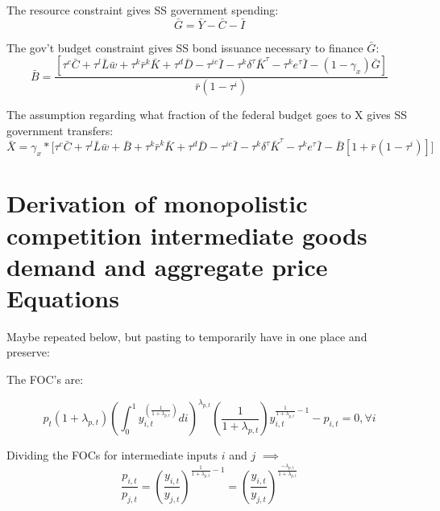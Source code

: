 The resource constraint gives SS government spending:
\begin{equation}
\bar{G} = \bar{Y}-\bar{C}-\bar{I}
\end{equation}

The gov't budget constraint gives SS bond issuance necessary to finance $\bar{G}$:
\begin{equation}
\bar{B} = \frac{\left[\tau^{c}\bar{C} + \tau^{l}\bar{L}\bar{w} + \tau^{k}\bar{r}^{k}\bar{K} + \tau^{d}\bar{D} - \tau^{ic}\bar{I} - \tau^{k}\delta^{\tau}\bar{K}^{\tau} - \tau^{k}e^{\tau}\bar{I}-(1-\gamma_{x})\bar{G}\right]}{\bar{r}(1-\tau^{i})}
\end{equation}

The assumption regarding what fraction of the federal budget goes to X gives SS government transfers:
\begin{equation}
\bar{X} = \gamma_{x}*\Biggl[\tau^{c}\bar{C} + \tau^{l}\bar{L}\bar{w} + \bar{B} + \tau^{k}\bar{r}^{k}\bar{K} + \tau^{d}\bar{D} - \tau^{ic}\bar{I} - \tau^{k}\delta^{\tau}\bar{K}^{\tau} - \tau^{k}e^{\tau}\bar{I} - \bar{B}\left[1+\bar{r}(1-\tau^{i})\right]\Biggr]
\end{equation}



\section{Derivation of monopolistic competition intermediate goods demand and aggregate price Equations}\label{TAppDemPrice}



Maybe repeated below, but pasting to temporarily have in one place and preserve:

The FOC's are:

\begin{equation}
p_{t}(1+\lambda_{p,t})\left(\int_{0}^{1}y_{i,t}^{\left(\frac{1}{1+\lambda_{p,t}}\right)}di\right)^{\lambda_{p,t}}\left(\frac{1}{1+\lambda_{p,t}}\right)y_{i,t}^{\frac{1}{1+\lambda_{p,t}}-1}-p_{i,t} = 0, \forall i
\end{equation}

Dividing the FOCs for intermediate inputs $i$ and $j$ $\implies$
\begin{equation}
\frac{p_{i,t}}{p_{j,t}} = \left(\frac{y_{i,t}}{y_{j,t}}\right)^{\frac{1}{1+\lambda_{p,t}}-1} = \left(\frac{y_{i,t}}{y_{j,t}}\right)^{\frac{-\lambda_{p,t}}{1+\lambda_{p,t}}}
\end{equation}

